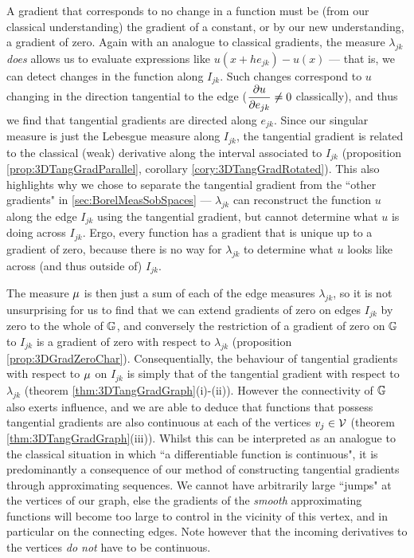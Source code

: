 A gradient that corresponds to no change in a function must be (from our classical understanding) the gradient of a constant, or by our new understanding, a gradient of zero.
Again with an analogue to classical gradients, the measure $\lambda_{jk}$ \emph{does} allows us to evaluate expressions like $u(x+he_{jk})-u(x)$ --- that is, we can detect changes in the function along $I_{jk}$.
Such changes correspond to $u$ changing in the direction tangential to the edge ($\dfrac{\partial u}{\partial e_{jk}}\neq 0$ classically), and thus we find that tangential gradients are directed along $e_{jk}$.
Since our singular measure is just the Lebesgue measure along $I_{jk}$, the tangential gradient is related to the classical (weak) derivative along the interval associated to $I_{jk}$ (proposition \ref{prop:3DTangGradParallel}, corollary \ref{cory:3DTangGradRotated}).
This also highlights why we chose to separate the tangential gradient from the ``other gradients" in \ref{sec:BorelMeasSobSpaces} --- $\lambda_{jk}$ can reconstruct the function $u$ along the edge $I_{jk}$ using the tangential gradient, but cannot determine what $u$ is doing across $I_{jk}$.
Ergo, every function has a gradient that is unique up to a gradient of zero, because there is no way for $\lambda_{jk}$ to determine what $u$ looks like across (and thus outside of) $I_{jk}$.

The measure $\mu$ is then just a sum of each of the edge measures $\lambda_{jk}$, so it is not unsurprising for us to find that we can extend gradients of zero on edges $I_{jk}$ by zero to the whole of $\mathbb{G}$, and conversely the restriction of a gradient of zero on $\mathbb{G}$ to $I_{jk}$ is a gradient of zero with respect to $\lambda_{jk}$ (proposition \ref{prop:3DGradZeroChar}).
Consequentially, the behaviour of tangential gradients with respect to $\mu$ on $I_{jk}$ is simply that of the tangential gradient with respect to $\lambda_{jk}$ (theorem \ref{thm:3DTangGradGraph}(i)-(ii)).
However the connectivity of $\mathbb{G}$ also exerts influence, and we are able to deduce that functions that possess tangential gradients are also continuous at each of the vertices $v_j\in\mathcal{V}$ (theorem \ref{thm:3DTangGradGraph}(iii)).
Whilst this can be interpreted as an analogue to the classical situation in which ``a differentiable function is continuous", it is predominantly a consequence of our method of constructing tangential gradients through approximating sequences.
We cannot have arbitrarily large ``jumps" at the vertices of our graph, else the gradients of the \emph{smooth} approximating functions will become too large to control in the vicinity of this vertex, and in particular on the connecting edges.
Note however that the incoming derivatives to the vertices \emph{do not} have to be continuous.

